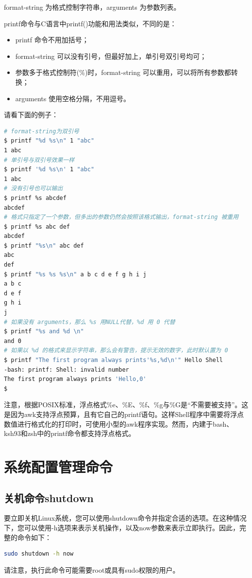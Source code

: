 format-string 为格式控制字符串，arguments 为参数列表。

printf命令与C语言中printf()功能和用法类似，不同的是：
\begin{itemize}
\item printf 命令不用加括号；
\item format-string 可以没有引号，但最好加上，单引号双引号均可；
\item 参数多于格式控制符(\%)时，format-string 可以重用，可以将所有参数都转换；
\item arguments 使用空格分隔，不用逗号。
\end{itemize}
请看下面的例子：
\begin{lstlisting}[language=sh]
# format-string为双引号
$ printf "%d %s\n" 1 "abc"
1 abc
# 单引号与双引号效果一样 
$ printf '%d %s\n' 1 "abc" 
1 abc
# 没有引号也可以输出
$ printf %s abcdef
abcdef
# 格式只指定了一个参数，但多出的参数仍然会按照该格式输出，format-string 被重用
$ printf %s abc def
abcdef
$ printf "%s\n" abc def
abc
def
$ printf "%s %s %s\n" a b c d e f g h i j
a b c
d e f
g h i
j
# 如果没有 arguments，那么 %s 用NULL代替，%d 用 0 代替
$ printf "%s and %d \n" 
and 0
# 如果以 %d 的格式来显示字符串，那么会有警告，提示无效的数字，此时默认置为 0
$ printf "The first program always prints'%s,%d\n'" Hello Shell
-bash: printf: Shell: invalid number
The first program always prints 'Hello,0'
$
\end{lstlisting}
注意，根据POSIX标准，浮点格式\%e、\%E、\%f、\%g与\%G是“不需要被支持”。这是因为awk支持浮点预算，且有它自己的printf语句。这样Shell程序中需要将浮点数值进行格式化的打印时，可使用小型的awk程序实现。然而，内建于bash、ksh93和zsh中的printf命令都支持浮点格式。



\section{系统配置管理命令}
\subsection{关机命令shutdown}
要立即关机Linux系统，您可以使用shutdown命令并指定合适的选项。在这种情况下，您可以使用-h选项来表示关机操作，以及now参数来表示立即执行。因此，完整的命令如下：
\begin{lstlisting}[language=sh]
sudo shutdown -h now
\end{lstlisting}
请注意，执行此命令可能需要root或具有sudo权限的用户。








